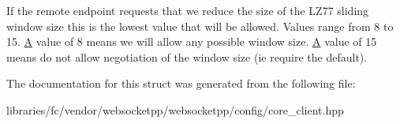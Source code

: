 If the remote endpoint requests that we reduce the size of the L\+Z77 sliding window size this is the lowest value that will be allowed. Values range from 8 to 15. \mbox{\hyperlink{struct_a}{A}} value of 8 means we will allow any possible window size. \mbox{\hyperlink{struct_a}{A}} value of 15 means do not allow negotiation of the window size (ie require the default). 

The documentation for this struct was generated from the following file\+:\begin{DoxyCompactItemize}
\item 
libraries/fc/vendor/websocketpp/websocketpp/config/core\+\_\+client.\+hpp\end{DoxyCompactItemize}
